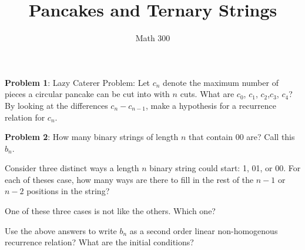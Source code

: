 \documentclass[11pt]{amsart}
\title{Pancakes and Ternary Strings}
\author{Math 300}
\newenvironment{packed_enum}{
\begin{enumerate}
  \setlength{\itemsep}{1pt}
  \setlength{\parskip}{0pt}
  \setlength{\parsep}{0pt}
}{\end{enumerate}}
\begin{document}
\maketitle


{\bf  Problem 1}:  Lazy Caterer Problem:  Let $c_n$ denote the maximum number of pieces a circular pancake can be cut into with $n$ cuts.  What are $c_0$, $c_1$, $c_2$,$c_3$, $c_4$?  By looking at the differences $c_n-c_{n-1}$, make a hypothesis for  a recurrence relation for $c_n$. \vfill

{\bf Problem 2}: How many binary strings of length $n$ that contain 00 are? Call this $b_n$. 
\begin{packed_enum}
\item Consider three distinct ways a length $n$ binary string could start:  1,  01, or  00.  For each of theses case, how many ways are there to fill in the rest of the $n-1$ or $n-2$ positions in the string?  
\item One of these three cases is not like the others.  Which one?
\item Use the above answers to write $b_n$ as a second order linear non-homogenous recurrence relation?  What are the initial conditions?
\end{packed_enum}
\vfill
\end{document}
